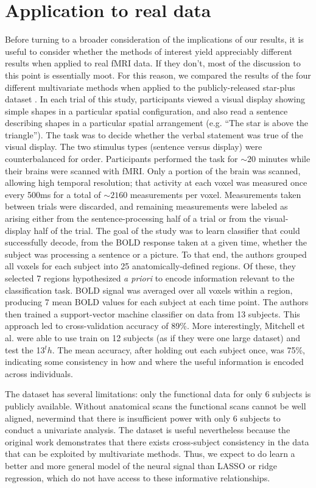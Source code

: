 \section{Application to real data}

Before turning to a broader consideration of the implications of our results, it is useful to consider whether the methods of interest yield appreciably different results when applied to real fMRI data. If they don't, most of the discussion to this point is essentially moot. For this reason, we compared the results of the four different multivariate methods when applied to the publicly-released star-plus dataset \cite{mitchell_learning_2004}. In each trial of this study, participants viewed a visual display showing simple shapes in a particular spatial configuration, and also read a sentence describing shapes in a particular spatial arrangement (e.g. ``The star is above the triangle''). The task was to decide whether the verbal statement was true of the visual display. The two stimulus types (sentence versus display) were counterbalanced for order. Participants performed the task for $\sim20$ minutes while their brains were scanned with fMRI. Only a portion of the brain was scanned, allowing high temporal resolution; that activity at each voxel was measured once every 500ms for a total of $\sim2160$ measurements per voxel. Measurements taken between trials were discarded, and remaining measurements were labeled as arising either from the sentence-processing half of a trial or from the visual-display half of the trial. The goal of the study was to learn classifier that could successfully decode, from the BOLD response taken at a given time, whether the subject was processing a sentence or a picture. To that end, the authors grouped all voxels for each subject into 25 anatomically-defined regions. Of these, they selected 7 regions hypothesized {\it a priori} to encode information relevant to the classification task. BOLD signal was averaged over all voxels within a region, producing 7 mean BOLD values for each subject at each time point. The authors then trained a support-vector machine classifier on data from 13 subjects. This approach led to cross-validation accuracy of 89\%. More interestingly, Mitchell et al. were able to use train on 12 subjects (as if they were one large dataset) and test the 13$^th$. The mean accuracy, after holding out each subject once, was 75\%, indicating some consistency in how and where the useful information is encoded across individuals.

The dataset has several limitations: only the functional data for only 6 subjects is publicly available. Without anatomical scans the functional scans cannot be well aligned, nevermind that there is insufficient power with only 6 subjects to conduct a univariate analysis. The dataset is useful nevertheless because the original work demonstrates that there exists cross-subject consistency in the data that can be exploited by multivariate methods. Thus, we expect \soslasso to do learn a better and more general model of the neural signal than LASSO or ridge regression, which do not have access to these informative relationships.


